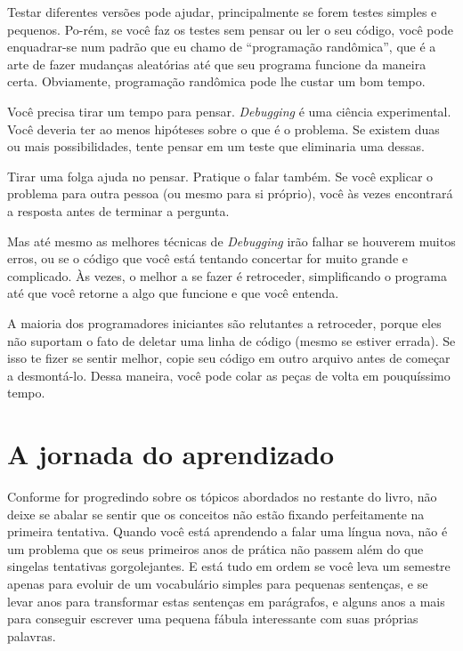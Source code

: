 Testar diferentes versões pode ajudar, principalmente se forem testes simples e pequenos. Po-rém, se você faz os testes sem pensar ou ler o seu código, você pode enquadrar-se num padrão que eu chamo de “programação randômica”, que é a arte de fazer mudanças aleatórias até que seu programa funcione da maneira certa. Obviamente, programação randômica pode lhe custar um bom tempo.

Você precisa tirar um tempo para pensar. {\it Debugging} é uma ciência experimental. Você deveria ter ao menos hipóteses sobre o que é o problema. Se existem duas ou mais possibilidades, tente pensar em um teste que eliminaria uma dessas.

Tirar uma folga ajuda no pensar. Pratique o falar também. Se você explicar o problema para outra pessoa (ou mesmo para si próprio), você às vezes encontrará a resposta antes de terminar a pergunta.

Mas até mesmo as melhores técnicas de {\it Debugging} irão falhar se houverem muitos erros, ou se o código que você está tentando concertar for muito grande e complicado. Às vezes, o melhor a se fazer é retroceder, simplificando o programa até que você retorne a algo que funcione e que você entenda.

A maioria dos programadores iniciantes são relutantes a retroceder, porque eles não suportam o fato de deletar uma linha de código (mesmo se estiver errada). Se isso te fizer se sentir melhor, copie seu código em outro arquivo antes de começar a desmontá-lo. Dessa maneira, você pode colar as peças de volta em pouquíssimo tempo.


\section{A jornada do aprendizado} %

Conforme for progredindo sobre os tópicos abordados no restante do livro, não deixe se abalar se sentir que os conceitos não estão fixando perfeitamente na primeira tentativa. Quando você está aprendendo a falar uma língua nova, não é um problema que os seus primeiros anos de prática não passem além do que singelas tentativas gorgolejantes. E está tudo em ordem se você leva um semestre apenas para evoluir de um vocabulário simples para pequenas sentenças, e se levar anos para transformar estas sentenças em parágrafos, e alguns anos a mais para conseguir escrever uma pequena fábula interessante com suas próprias palavras.

